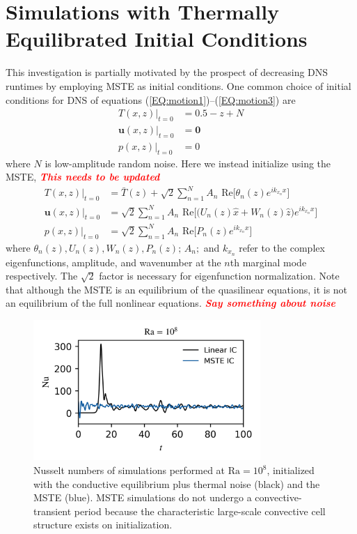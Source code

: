 \documentclass[reprint,amsmath,amssymb,aps]{revtex4-1}
\newcommand{\note}[1]{\noindent \textbf{\textit{\textcolor{Red}{#1}}}}
\newcommand\Ra{\mathrm{Ra}}
\renewcommand{\vec}[1]{\boldsymbol{#1}}
\newcommand{\eqss}[2]{(\ref{#1})--(\ref{#2})}
\begin{document}
\section{Simulations with Thermally Equilibrated Initial Conditions}\label{sec:sims}
This investigation is partially motivated by the prospect of decreasing DNS runtimes by employing MSTE as initial conditions. 
One common choice of initial conditions for DNS of equations \eqss{EQ:motion1}{EQ:motion3} are
\begin{align}
    T(x, z)\big|_{t=0} &= 0.5 - z + N \nonumber \\
    \vec{u}(x, z)\big|_{t=0} &= \vec{0} \nonumber \\
    p(x, z)\big|_{t=0} &= 0 \label{EQ:linear_ic}
\end{align}
where $N$ is low-amplitude random noise.
Here we instead initialize using the MSTE,
\note{This needs to be updated}
\begin{align}
    T(x, z)\big|_{t=0} &= \bar{T}(z) + \sqrt{2} \sum_{n=1}^N  A_n \text{ Re} \Big[ \theta_n(z) e^{ik_{x_n}x} \Big] \nonumber \\
    \vec{u}(x, z)\big|_{t=0} &= \sqrt{2} \sum_{n=1}^N A_n \text{ Re} \Big[\Big( U_n (z) \hat{x} + W_n(z) \hat{z} \Big) e^{ik_{x_n}x} \Big] \nonumber\\
    p(x, z)\big|_{t=0} &= \sqrt{2} \sum_{n=1}^N A_n \text{ Re} \Big[P_n (z) e^{ik_{x_n}x}\Big] \label{EQ:mste_ic}
\end{align}
where $\theta_n(z), U_n(z), W_n(z), P_n(z); \, A_n; $ and $k_{x_n}$ refer to the complex eigenfunctions, amplitude, and wavenumber at the $n$th marginal mode respectively. 
The $\sqrt{2}$ factor is necessary for eigenfunction normalization. 
Note that although the MSTE is an equilibrium of the quasilinear equations, it is not an equilibrium of the full nonlinear equations.
\note{Say something about noise}

\begin{figure}
    \begin{minipage}{3.4in}
        \centering
        \includegraphics[width=3.4in]{sim_eq_nu.png}
        \caption{Nusselt numbers of simulations performed at $\Ra = 10^8$, initialized with the conductive equilibrium plus thermal noise (black) and the MSTE (blue). 
        MSTE simulations do not undergo a convective-transient period because the characteristic large-scale convective cell structure exists on initialization.}
        \label{fig:nu_sim}
    \end{minipage}
\end{figure}
\end{document}
